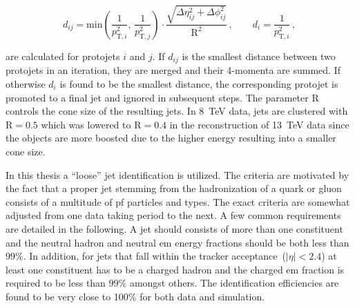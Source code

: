 \begin{equation}
d_{ij}=\mathrm{min}\left(\frac{1}{p_{\mathrm{T},i}^{2}},\,\frac{1}{p_{\mathrm{T},j}^{2}}\right)\cdot\frac{\sqrt{\Delta\eta_{ij}^{2}+\Delta\phi_{ij}^{2}}}{\mathrm{R}^2}\,,\qquad d_{i}=\frac{1}{p_{\mathrm{T},i}^{2}}\,,
\end{equation}

are calculated for protojets $i$ and $j$.  If $d_{ij}$ is the smallest distance between two protojets in an iteration, they are merged and their 4-momenta are summed. If otherwise $d_{i}$ is found to be the smallest distance, the corresponding protojet is promoted to a final jet and ignored in subsequent steps. The parameter $\mathrm{R}$ controls the cone size of the resulting jets. In 8~TeV data, jets are clustered with $\mathrm{R}=0.5$ which was lowered to $\mathrm{R}=0.4$ in the reconstruction of 13~TeV data since the objects are more boosted due to the higher energy resulting into a smaller cone size.

In this thesis a ``loose'' jet identification is utilized. The criteria are motivated by the fact that a proper jet stemming from the hadronization of a quark or gluon consists of a multitude of \gls{pf} particles and types. The exact criteria are somewhat adjusted from one data taking period to the next. A few common requirements are detailed in the following. A jet should consists of more than one constituent and the neutral hadron and neutral \gls{em} energy fractions should be both less than $99\%$. In addition, for jets that fall within the tracker acceptance~($|\eta|<2.4$) at least one constituent has to be a charged hadron and the charged \gls{em} fraction is required to be less than $99\%$ amongst others. The identification efficiencies are found to be very close to 100\% for both data and simulation.

